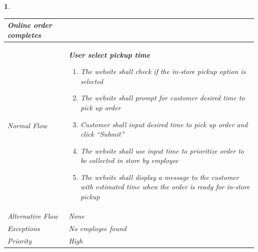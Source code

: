 \documentclass{scrreprt}
\theoremstyle{funreq}
\newtheorem{funreq}{}
\begin{document}
\begin{funreq}
\begin{table}[H]
{\begin{tabularx}{\columnwidth}{|l|X|}
					Online order completes
					\\ \hline Normal Flow &
					\bfseries{User select pickup time}\normalfont\newline 
					\begin{enumerate}
					    \item The website shall check if the in-store pickup option is selected
					    \item The website shall prompt for customer desired time to pick up order
                        \item Customer shall input desired time to pick up order and click “Submit”
                        \item The website shall use input time to prioritize order to be collected in store by employee
                        \item The website shall display a message to the customer with estimated time when the order is ready for in-store pickup
					\end{enumerate}
					\\ \hline Alternative Flow & 
					None
					\\ \hline Exceptions & 
					No employee found
					\\ \hline Priority & 
					High
					\\ \hline
				\end{tabularx}%
			}
		\end{table}
	\end{funreq}


\end{document}
